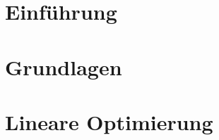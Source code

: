 \documentclass[ngerman, a4paper, 11pt]{report}
\institute{Numerik}
\begin{document}
\makeTUtitle
    
\tableofcontents

\chapter{Einführung}
\label{chapter_1_einfuehrung}




\chapter{Grundlagen}
\label{chapter_2_grundlagen}




\chapter{Lineare Optimierung}
\label{chapter_3_lineareOptimierung}


\end{document}
